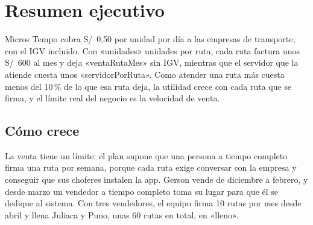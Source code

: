 \documentclass[10.5pt,a4paper]{article}
\begin{document}
\section{Resumen ejecutivo}

Micros Tempo cobra S/~0,50 por unidad por día a las empresas de transporte, con el IGV incluido. Con «unidades» unidades por ruta, cada ruta factura unos S/~600 al mes y deja «ventaRutaMes» sin IGV, mientras que el servidor que la atiende cuesta unos «servidorPorRuta». Como atender una ruta más cuesta menos del 10\,\% de lo que esa ruta deja, la utilidad crece con cada ruta que se firma, y el límite real del negocio es la velocidad de venta.

\noindent
\begin{minipage}[t]{0.32\linewidth}\end{minipage}\hfill
\begin{minipage}[t]{0.32\linewidth}\end{minipage}\hfill
\begin{minipage}[t]{0.32\linewidth}\end{minipage}

\vspace{4pt}\noindent
\begin{minipage}[t]{0.32\linewidth}\end{minipage}\hfill
\begin{minipage}[t]{0.32\linewidth}\end{minipage}\hfill
\begin{minipage}[t]{0.32\linewidth}\end{minipage}

\subsection{Cómo crece}

La venta tiene un límite: el plan supone que una persona a tiempo completo firma una ruta por semana, porque cada ruta exige conversar con la empresa y conseguir que sus choferes instalen la app. Gerson vende de diciembre a febrero, y desde marzo un vendedor a tiempo completo toma su lugar para que él se dedique al sistema. Con tres vendedores, el equipo firma 10 rutas por mes desde abril y llena Juliaca y Puno, unas 60 rutas en total, en «lleno».
\end{document}
